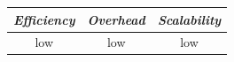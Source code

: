 \begin{center}
\begin{tabular}{ccc}
\emph{Efficiency} & \emph{Overhead} & \emph{Scalability} \\
\hline
low &
low &
low
\end{tabular}
\end{center}


